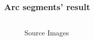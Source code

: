 \documentclass[aspectratio=169]{beamer}
\begin{document}
    \begin{frame}
        \frametitle{Arc segments' result}
    
        \begin{columns}
            \begin{column}{.5\linewidth}
                \begin{figure}[htbp]
                    \centering
                    \quad
                    \caption{Source Images}
                \end{figure}
            \end{column}
            \begin{column}{.5\linewidth}
                \begin{figure}[htbp]
                    \centering
\end{figure}
\end{column}
\end{columns}
\end{frame}
\end{document}
